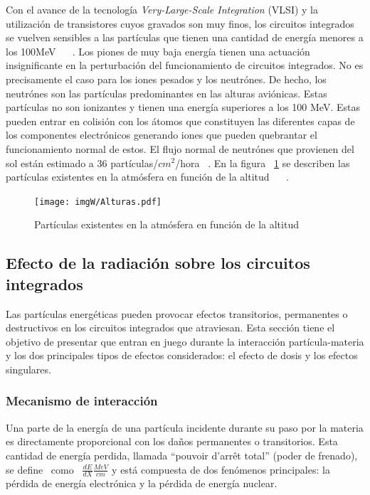 \documentclass[a4paper,openright,12pt]{report}
\begin{document}
Con el avance de la tecnología \textit{Very-Large-Scale Integration} (VLSI) y la utilización de transistores cuyos gravados son muy finos, los circuitos integrados se vuelven sensibles a las partículas que tienen una cantidad de energía menores a los 100MeV ~\cite{taber1995}
~\cite{taber1993single}. Los piones de muy baja energía tienen una actuación insignificante en la perturbación del funcionamiento de circuitos integrados. No es precisamente el caso para los iones pesados y los neutrónes. De hecho, los neutrónes son las partículas predominantes en las alturas aviónicas. Estas partículas no son ionizantes y tienen una energía superiores a los 100 MeV. Estas pueden entrar en colisión con los átomos que constituyen las diferentes capas de los componentes electrónicos generando iones que pueden quebrantar el funcionamiento normal de estos. El flujo normal de neutrónes que provienen del sol están estimado a 36 partículas/$cm^2$/hora ~\cite{standard2001measurement}. En la  figura ~\ref{Alturas} se describen las partículas existentes en la atmósfera en función de la altitud ~\cite{o1971natural} ~\cite{o1978luin}. 



\begin{figure}[H]
	\centering
	\texttt{[image: imgW/Alturas.pdf]}
	\caption{Partículas existentes en la atmósfera en función de la altitud   }\cite{mansour2012methodes}
	\label{Alturas}
\end{figure}


\subsection{Efecto de la radiación sobre los circuitos integrados }

Las partículas energéticas pueden provocar efectos transitorios, permanentes o destructivos en los circuitos integrados que atraviesan. Esta sección tiene el objetivo de presentar  que entran en juego durante la interacción partícula-materia y los dos principales tipos de efectos considerados: el efecto de dosis y los efectos singulares.

\subsubsection{Mecanismo de interacción }

Una parte de la energía de una partícula incidente durante su paso por la materia es directamente proporcional con los daños permanentes o transitorios. Esta cantidad de energía perdida, llamada ``pouvoir d'arrêt total'' (poder de frenado), se define ~como ~$\frac{dE}{dX} \frac{MeV}{cm}$  y está compuesta de dos fenómenos principales: la pérdida de energía electrónica y la pérdida de energía nuclear.
\end{document}
